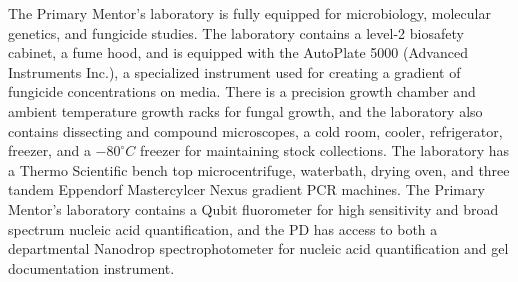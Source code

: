 \documentclass[12pt,letterpaper]{article}
\title{\ruleline{Equipment}}
\begin{document}
\maketitle

The Primary Mentor's laboratory is fully equipped for microbiology, molecular genetics, and fungicide studies. The laboratory contains a level-2 biosafety cabinet, a fume hood, and is equipped with the AutoPlate 5000 (Advanced Instruments Inc.), a specialized instrument used for creating a gradient of fungicide concentrations on media. There is a precision growth chamber and ambient temperature growth racks for fungal growth, and the laboratory also contains dissecting and compound microscopes, a cold room, cooler, refrigerator, freezer, and a $-80^{\circ}C$  freezer for maintaining stock collections. The laboratory has a Thermo Scientific bench top microcentrifuge, waterbath, drying oven, and three tandem Eppendorf Mastercylcer Nexus gradient PCR machines. The Primary Mentor's laboratory contains a Qubit fluorometer for high sensitivity and broad spectrum nucleic acid quantification, and the PD has access to both a departmental Nanodrop spectrophotometer for nucleic acid quantification and gel documentation instrument.
\end{document}
